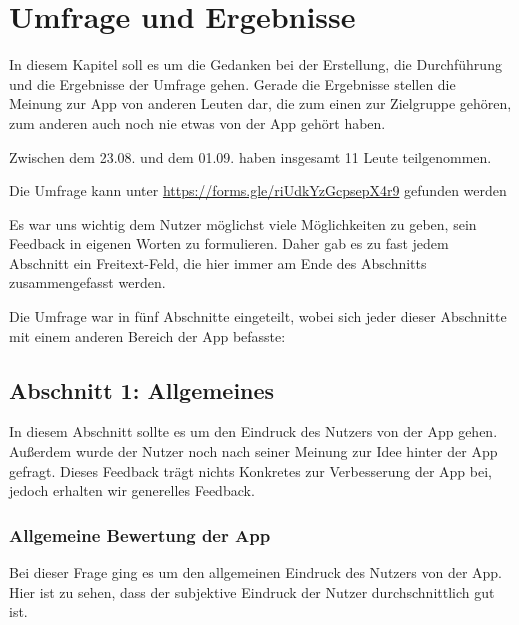 
\section{Umfrage und Ergebnisse}

    In diesem Kapitel soll es um die Gedanken bei der Erstellung, die Durchführung und die Ergebnisse der Umfrage gehen.
    Gerade die Ergebnisse stellen die Meinung zur App von anderen Leuten dar, die zum einen zur Zielgruppe gehören, zum anderen auch noch nie etwas von der App gehört haben.

    Zwischen dem 23.08. und dem 01.09. haben insgesamt 11 Leute teilgenommen.

    \begin{center}
        Die Umfrage kann unter \url{https://forms.gle/riUdkYzGcpsepX4r9} gefunden werden
    \end{center}

    Es war uns wichtig dem Nutzer möglichst viele Möglichkeiten zu geben, sein Feedback in eigenen Worten zu formulieren. Daher gab es zu fast jedem Abschnitt ein Freitext-Feld, die hier immer am Ende des Abschnitts zusammengefasst werden.

    Die Umfrage war in fünf Abschnitte eingeteilt, wobei sich jeder dieser Abschnitte mit einem anderen Bereich der App befasste:

    \newpage

    \subsection{Abschnitt 1: Allgemeines}

        In diesem Abschnitt sollte es um den Eindruck des Nutzers von der App gehen. Außerdem wurde der Nutzer noch nach seiner Meinung zur Idee hinter der App gefragt. Dieses Feedback trägt nichts Konkretes zur Verbesserung der App bei, jedoch erhalten wir generelles Feedback.

        \subsubsection{Allgemeine Bewertung der App}

            Bei dieser Frage ging es um den allgemeinen Eindruck des Nutzers von der App. Hier ist zu sehen, dass der subjektive Eindruck der Nutzer durchschnittlich gut ist.

            \begin{bchart} [min = 0, max = 10, step = 2]
                \bigskip
                \bigskip
                \bigskip
                \bigskip
            \end{bchart}

